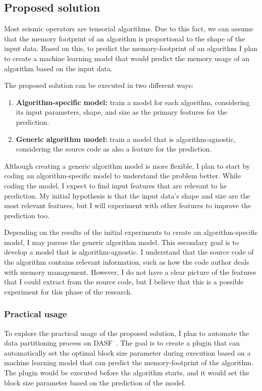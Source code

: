 \subsection{Proposed solution}
\label{subsec:proposed-solution}

Most seismic operators are tensorial algorithms.
Due to this fact, we can assume that the memory footprint of an algorithm is proportional to the shape of the input data.
Based on this, to predict the memory-footprint of an algorithm I plan to create a machine learning model that would predict the memory usage of an algorithm based on the input data. 

The proposed solution can be executed in two different ways:

\begin{enumerate}
  \item \textbf{Algorithm-specific model:} train a model for each algorithm, considering its input parameters, shape, and size as the primary features for the prediction.
  \item \textbf{Generic algorithm model:} train a model that is algorithm-agnostic, considering the source code as also a feature for the prediction.
\end{enumerate}

Although creating a generic algorithm model is more flexible, I plan to start by coding an algorithm-specific model to understand the problem better.
While coding the model, I expect to find input features that are relevant to he prediction.
My initial hypothesis is that the input data's shape and size are the most relevant features, but I will experiment with other features to improve the prediction too.

Depending on the results of the initial experiments to create an algorithm-specific model, I may pursue the generic algorithm model.
This secondary goal is to develop a model that is algorithm-agnostic.
I understand that the source code of the algorithm contains relevant information, such as how the code author deals with memory management.
However, I do not have a clear picture of the features that I could extract from the source code, but I believe that this is a possible experiment for this phase of the research.

\subsubsection{Practical usage}

To explore the practical usage of the proposed solution, I plan to automate the data partitioning process on \ac{DASF}~\cite{dasf}.
The goal is to create a plugin that can automatically set the optimal block size parameter during execution based on a machine learning model that can predict the memory-footprint of the algorithm.
The plugin would be executed before the algorithm starts, and it would set the block size parameter based on the prediction of the model.
